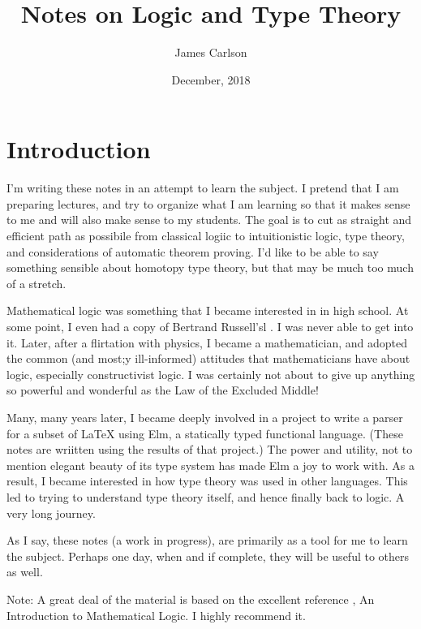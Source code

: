 
\title{Notes on Logic and Type Theory}
\author{James Carlson}
\date{December, 2018}

\maketitle

\maintableofcontents



\section{Introduction}

I'm writing these notes in an attempt to learn the subject.  I pretend that I am preparing lectures, and try to organize what I am learning so that it makes sense to me and will also make sense to my students. The goal is to cut as straight and efficient path as possibile from classical logiic to intuitionistic logic, type theory, and considerations of automatic theorem proving.  I'd like to be able to say something sensible about homotopy type theory, but that may be much too much of a stretch.

Mathematical logic was something that I became interested in in high school.  At some point, I even had a copy of Bertrand Russell'sl .  I was never able to get into it.  Later, after a flirtation with physics, I became a mathematician, and adopted the common (and most;y ill-informed) attitudes that mathematicians have about logic, especially constructivist logic.  I was certainly not about to give up anything so powerful and wonderful as the Law of the Excluded Middle!

Many, many years later, I became deeply involved in a project to write a parser for a subset of LaTeX using Elm, a statically typed functional language.  (These notes are wriitten using the results of that project.) The power and utility, not to mention elegant beauty of its type system has made Elm a joy to work with.  As a result,  I became interested in how type theory was used  in other languages. This led to trying to understand type theory itself, and hence finally back to logic. A very long journey.

As I say, these notes (a work in progress), are primarily as a tool for me to learn the subject.  Perhaps one day, when and if complete, they will be useful to others as well.


Note: A great deal of the material is based on the excellent reference \cite{RH}, An Introduction to Mathematical Logic. I highly recommend it.
